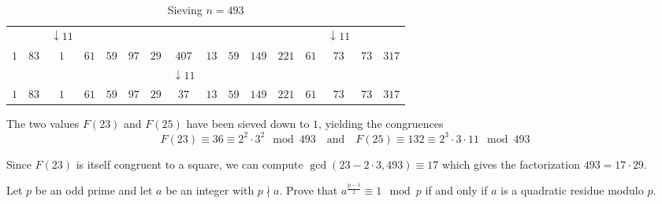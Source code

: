 \documentclass[12pt]{article}
\begin{document}
\begin{table}[!ht]
\begin{tabular}{|cccccccccccccccc|}
                         &      & $\downarrow 11$  &                &                  &                &                  &                 &                  &                  &                  &                &                  & $\downarrow 11$ &                  &                \\
        $1$              & $83$ & $1$              & $61$           & $59$             & $97$           & $29$             & $407$           & $13$             & $59$             & $149$            & $221$          & $61$             & $73$            & $73$             & $317$          \\
                         &      &                  &                &                  &                &                  & $\downarrow 11$ &                  &                  &                  &                &                  &                 &                  &                \\
        $1$              & $83$ & $1$              & $61$           & $59$             & $97$           & $29$             & $37$            & $13$             & $59$             & $149$            & $221$          & $61$             & $73$            & $73$             & $317$          \\
        \hline
    \end{tabular}
    \caption{Sieving $n=493$}
\end{table}

\noindent
The two values $F(23)$ and $F(25)$ have been sieved down to $1$, yielding the congruences
\[F(23)\equiv 36\equiv2^2\cdot3^2\mod{493}\quad\text{and}\quad F(25)\equiv132\equiv2^3\cdot3\cdot11\mod{493}\]

\noindent
Since $F(23)$ is itself congruent to a square, we can compute $\gcd(23-2\cdot3,493)\equiv17$ which gives the factorization $493=17\cdot29$.

\newpage
\problem Let $p$ be an odd prime and let $a$ be an integer with $p\nmid a$. Prove that $a^{\frac{p-1}{2}}\equiv 1\mod{p}$ if and only if $a$ is a quadratic residue modulo $p$.
\end{document}

